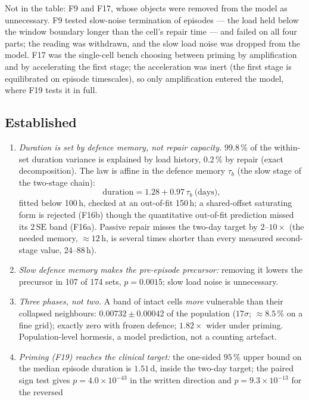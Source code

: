 \documentclass[11pt,a4paper]{article}
\theoremstyle{remark}
\begin{document}
Not in the table: F9 and F17, whose objects were removed from the model as
unnecessary. F9 tested slow-noise termination of episodes --- the load held below the
window boundary longer than the cell's repair time --- and failed on all four parts; the
reading was withdrawn, and the slow load noise was dropped from the model. F17 was the
single-cell bench choosing between priming by amplification and by accelerating the
first stage; the acceleration was inert (the first stage is equilibrated on episode
timescales), so only amplification entered the model, where F19 tests it in full.

\subsection{Established}\label{sec:survived}
\begin{enumerate}[leftmargin=1.2em]
\item \emph{Duration is set by defence memory, not repair capacity.} 99.8\,\% of the
within-set duration variance is explained by load history, 0.2\,\% by repair (exact
decomposition). The law is affine in the defence memory
$\tau_b$ (the slow stage of the two-stage chain):
\begin{equation}\label{eq:dur}
\text{duration}=1.28+0.97\,\tau_b\ \text{(days)},
\end{equation}
fitted below 100\,h, checked at an out-of-fit 150\,h; a shared-offset saturating form
is rejected (F16b) though the quantitative out-of-fit prediction missed its
$2\,\mathrm{SE}$ band (F16a). Passive repair misses the two-day target by $2$--$10\times$
(the needed memory, $\approx12$\,h, is several times shorter than every measured
second-stage value, 24--88\,h).
\item \emph{Slow defence memory makes the pre-episode precursor:} removing it lowers
the precursor in 107 of 174 sets, $p=0.0015$; slow load noise is unnecessary.
\item \emph{Three phases, not two.} A band of intact cells \emph{more} vulnerable than
their collapsed neighbours: $0.00732\pm0.00042$ of the population ($17\sigma$;
$\approx8.5\,\%$ on a fine grid); exactly zero with frozen defence; $1.82\times$ wider
under priming. Population-level hormesis, a model prediction, not a counting artefact.
\item \emph{Priming (F19) reaches the clinical target:} the one-sided $95\,\%$ upper bound on
the median episode duration is $1.51$\,d, inside the two-day target; the paired sign test gives
$p=4.0\times10^{-43}$ in the written direction and $p=9.3\times10^{-13}$ for the reversed

\end{enumerate}
\end{document}
